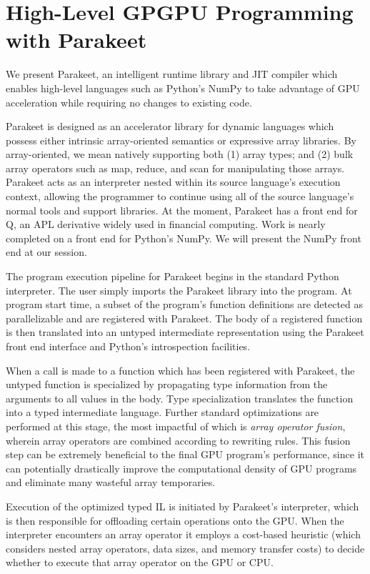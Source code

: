 \documentclass[10pt,twocolumn]{article}
\begin{document}
\section*{High-Level GPGPU Programming with Parakeet}
We present Parakeet, an intelligent runtime library and JIT compiler which enables high-level languages such as Python's NumPy to take advantage of GPU acceleration while requiring no changes to existing code.

Parakeet is designed as an accelerator library for dynamic languages which possess either intrinsic array-oriented semantics or expressive array libraries. By array-oriented, we mean natively supporting both (1) array types; and (2) bulk array operators such as map, reduce, and scan for manipulating those arrays. Parakeet acts as an interpreter nested within its source language's execution context, allowing the programmer to continue using all of the source language's normal tools and support libraries.  At the moment, Parakeet has a front end for Q, an APL derivative widely used in financial computing.  Work is nearly completed on a front end for Python's NumPy.  We will present the NumPy front end at our session.

The program execution pipeline for Parakeet begins in the standard Python interpreter. The user simply imports the Parakeet library into the program.  At program start time, a subset of the program's function definitions are detected as parallelizable and are registered with Parakeet. The body of a registered function is then translated into an untyped intermediate representation using the Parakeet front end interface and Python's introspection facilities.

When a call is made to a function which has been registered with Parakeet, the untyped function is specialized by propagating type information from the arguments to all values in the body.  Type specialization translates the function into a typed intermediate language. Further standard optimizations are performed at this stage, the most impactful of which is \emph{array operator fusion}, wherein array operators are combined according to rewriting rules. This fusion step can be extremely beneficial to the final GPU program's performance, since it can potentially drastically improve the computational density of GPU programs and eliminate many wasteful array temporaries. 

Execution of the optimized typed IL is initiated by Parakeet's interpreter, which is then responsible for offloading certain operations onto the GPU. When the interpreter encounters an array operator it employs a cost-based heuristic (which considers nested array operators, data sizes, and memory transfer costs) to decide whether to execute that array operator on the GPU or CPU.
\end{document}
